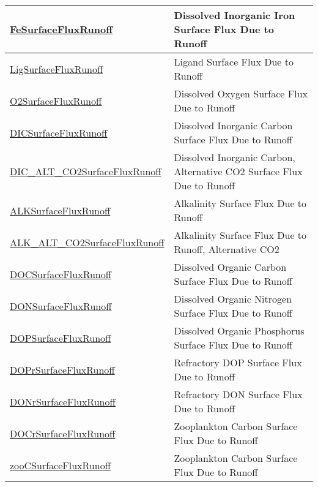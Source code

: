 {\begin{center}
\begin{longtable}{| p{2.0in} | p{4.0in} |}
    \hline
    \hyperref[subsec:var_sec_forcing_FeSurfaceFluxRunoff]{FeSurfaceFluxRunoff} & Dissolved Inorganic Iron Surface Flux Due to Runoff \\
    \hline
    \hyperref[subsec:var_sec_forcing_LigSurfaceFluxRunoff]{LigSurfaceFluxRunoff} & Ligand Surface Flux Due to Runoff \\
    \hline
    \hyperref[subsec:var_sec_forcing_O2SurfaceFluxRunoff]{O2SurfaceFluxRunoff} & Dissolved Oxygen Surface Flux Due to Runoff \\
    \hline
    \hyperref[subsec:var_sec_forcing_DICSurfaceFluxRunoff]{DICSurfaceFluxRunoff} & Dissolved Inorganic Carbon Surface Flux Due to Runoff \\
    \hline
    \hyperref[subsec:var_sec_forcing_DIC_ALT_CO2SurfaceFluxRunoff]{DIC\_ALT\_CO2SurfaceFlux\-Runoff} & Dissolved Inorganic Carbon, Alternative CO2 Surface Flux Due to Runoff \\
    \hline
    \hyperref[subsec:var_sec_forcing_ALKSurfaceFluxRunoff]{ALKSurfaceFluxRunoff} & Alkalinity Surface Flux Due to Runoff \\
    \hline
    \hyperref[subsec:var_sec_forcing_ALK_ALT_CO2SurfaceFluxRunoff]{ALK\_ALT\_CO2SurfaceFlux\-Runoff} & Alkalinity Surface Flux Due to Runoff, Alternative CO2 \\
    \hline
    \hyperref[subsec:var_sec_forcing_DOCSurfaceFluxRunoff]{DOCSurfaceFluxRunoff} & Dissolved Organic Carbon Surface Flux Due to Runoff \\
    \hline
    \hyperref[subsec:var_sec_forcing_DONSurfaceFluxRunoff]{DONSurfaceFluxRunoff} & Dissolved Organic Nitrogen Surface Flux Due to Runoff \\
    \hline
    \hyperref[subsec:var_sec_forcing_DOPSurfaceFluxRunoff]{DOPSurfaceFluxRunoff} & Dissolved Organic Phosphorus Surface Flux Due to Runoff \\
    \hline
    \hyperref[subsec:var_sec_forcing_DOPrSurfaceFluxRunoff]{DOPrSurfaceFluxRunoff} & Refractory DOP Surface Flux Due to Runoff \\
    \hline
    \hyperref[subsec:var_sec_forcing_DONrSurfaceFluxRunoff]{DONrSurfaceFluxRunoff} & Refractory DON Surface Flux Due to Runoff \\
    \hline
    \hyperref[subsec:var_sec_forcing_DOCrSurfaceFluxRunoff]{DOCrSurfaceFluxRunoff} & Zooplankton Carbon Surface Flux Due to Runoff \\
    \hline
    \hyperref[subsec:var_sec_forcing_zooCSurfaceFluxRunoff]{zooCSurfaceFluxRunoff} & Zooplankton Carbon Surface Flux Due to Runoff \\

\end{longtable}
\end{center}}
